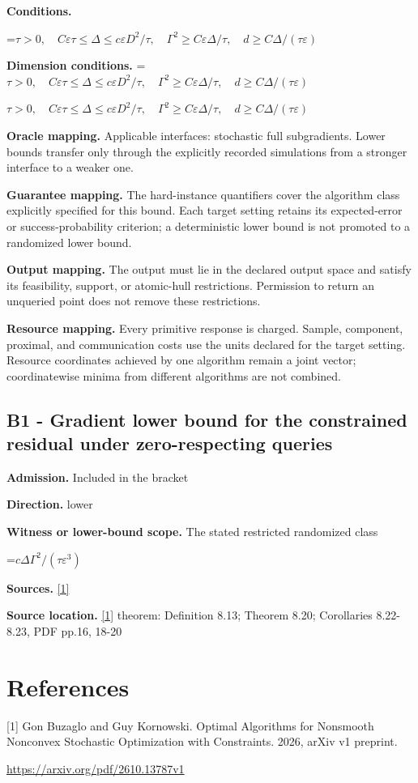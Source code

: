 \documentclass[10pt,a4paper]{article}
\newcommand{\AtlasMath}[1]{\par\begingroup\centering\setbox0=\hbox{$\displaystyle #1$}\ifdim\wd0>1.4\linewidth\typeout{ATLAS WIDE FORMULA: \the\wd0}\fi\ifdim\wd0>\linewidth\resizebox{\linewidth}{!}{\box0}\else\box0\fi\par\endgroup}
\newcommand{\AtlasInlineMath}[1]{\begingroup\setbox0=\hbox{$#1$}\ifdim\wd0>.4\linewidth\endgroup\AtlasMath{#1}\else\endgroup$#1$\fi}
\begin{document}
\textbf{Conditions.} 
\AtlasMath{\tau>0,\quad C\varepsilon\tau\le\Delta\le c\varepsilon D^2/\tau,\quad\Gamma^2\ge C\varepsilon\Delta/\tau,\quad d\ge C\Delta/(\tau\varepsilon)}


\textbf{Dimension conditions.} \AtlasInlineMath{\tau>0,\quad C\varepsilon\tau\le\Delta\le c\varepsilon D^2/\tau,\quad\Gamma^2\ge C\varepsilon\Delta/\tau,\quad d\ge C\Delta/(\tau\varepsilon)}

\textbf{Oracle mapping.} Applicable interfaces: stochastic full subgradients. Lower bounds transfer only through the explicitly recorded simulations from a stronger interface to a weaker one.

\textbf{Guarantee mapping.} The hard-instance quantifiers cover the algorithm class explicitly specified for this bound. Each target setting retains its expected-error or success-probability criterion; a deterministic lower bound is not promoted to a randomized lower bound.

\textbf{Output mapping.} The output must lie in the declared output space and satisfy its feasibility, support, or atomic-hull restrictions. Permission to return an unqueried point does not remove these restrictions.

\textbf{Resource mapping.} Every primitive response is charged. Sample, component, proximal, and communication costs use the units declared for the target setting. Resource coordinates achieved by one algorithm remain a joint vector; coordinatewise minima from different algorithms are not combined.

\subsection{B1 - Gradient lower bound for the constrained residual under zero-respecting queries}
\textbf{Admission.} Included in the bracket

\textbf{Direction.} lower

\textbf{Witness or lower-bound scope.} The stated restricted randomized class

\AtlasMath{c\Delta\Gamma^2/(\tau\varepsilon^3)}
\textbf{Sources.} \href{https://arxiv.org/pdf/2610.13787v1}{[1]}

\textbf{Source location.} \href{https://arxiv.org/pdf/2610.13787v1}{[1]} theorem: Definition 8.13; Theorem 8.20; Corollaries 8.22-8.23, PDF pp.16, 18-20

\section{References}
[1] Gon Buzaglo and Guy Kornowski. Optimal Algorithms for Nonsmooth Nonconvex Stochastic Optimization with Constraints. 2026, arXiv v1 preprint.

\url{https://arxiv.org/pdf/2610.13787v1}
\end{document}
